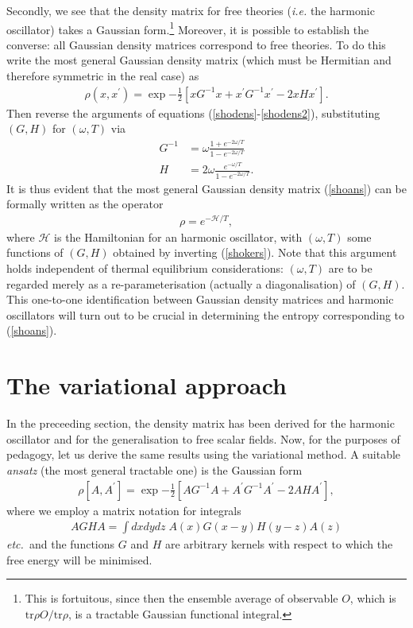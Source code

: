 \documentclass[a4paper,a4paper]{article}
\begin{document}
Secondly, we see that the density matrix for free theories (\emph{i.e.} the harmonic oscillator) takes a Gaussian form.\footnote{This
is fortuitous, since then the ensemble average of observable $O$, 
which is $\mathrm{tr} \rho O / \mathrm{tr} \rho$, is a tractable Gaussian functional integral.}
Moreover, it is possible to establish the converse: all Gaussian density matrices correspond to free theories. To do this
write the most general Gaussian density matrix (which must be Hermitian and therefore symmetric in the real case) as
\begin{gather} \label{shoans}
\rho(x,x^{'}) = \exp{-\frac{1}{2} [x G^{-1} x + x^{'} G^{-1} x^{'} - 2 x H x^{'}]}.
\end{gather}
Then reverse the arguments of equations (\ref{shodens}-\ref{shodens2}), substituting $(G,H)$ for $(\omega,T)$ via
\begin{align} \label{shokers}
G^{-1} &= \omega \frac{1+e^{-2\omega / T}}{1-e^{-2\omega / T}} \nonumber \\
H &= 2 \omega \frac{e^{-\omega / T}}{1-e^{-2\omega / T}}.
\end{align}
It is thus evident that the most general Gaussian density matrix (\ref{shoans}) can be formally written as the operator
\begin{gather}
\rho = e^{-\mathcal{H}/T},
\end{gather}
where $\mathcal{H}$ is the Hamiltonian for an harmonic oscillator, with $(\omega,T)$ some functions of $(G,H)$ obtained by inverting
(\ref{shokers}). Note that this argument holds independent of thermal equilibrium considerations: $(\omega,T)$ are to be regarded
merely as a re-parameterisation (actually a diagonalisation) of $(G,H)$. 
This one-to-one identification between Gaussian density matrices and harmonic oscillators will turn out to be crucial in determining
the entropy corresponding to (\ref{shoans}). 
%
%
%
%
%
%
%
\section{The variational approach} \label{sec:var}
In the preceeding section, the density matrix has been derived for the harmonic oscillator and for the generalisation to
 free scalar fields. 
Now, for the purposes of pedagogy, let us derive the same results using the variational method. A suitable \emph{ansatz}
(the most general tractable one) is the Gaussian form
\begin{gather} \label{shoans2}
\rho[A,A^{'}] = \exp{-\frac{1}{2} [A G^{-1} A + A^{'} G^{-1} A^{'} - 2 A H A^{'}]},
\end{gather}
where we employ a matrix notation for integrals
\begin{gather} \label{matnot}
A G H A = \int dxdydz \; A(x) G (x-y) H (y-z) A(z) 
\end{gather}
\emph{etc.\ }and the functions $G$ and $H$ are arbitrary kernels with respect to which the free energy will be minimised.
\end{document}
